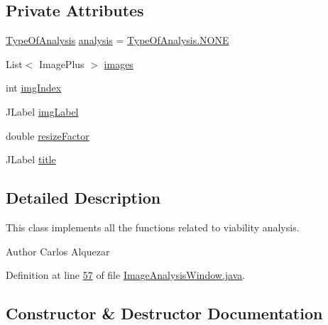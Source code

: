 \subsection*{Private Attributes}
\begin{DoxyCompactItemize}
\item 
\hyperlink{enumgui_1_1_image_analysis_window_1_1_type_of_analysis}{Type\+Of\+Analysis} \hyperlink{classgui_1_1_image_analysis_window_ae0c6f15cfb3c589fb7817738e51998bd}{analysis} = \hyperlink{enumgui_1_1_image_analysis_window_1_1_type_of_analysis_a899caa602e4fff675b17cdbab33607ec}{Type\+Of\+Analysis.\+N\+O\+NE}
\item 
List$<$ Image\+Plus $>$ \hyperlink{classgui_1_1_image_analysis_window_ab901d2d996b0bf250698c764d1c3949c}{images}
\item 
int \hyperlink{classgui_1_1_image_analysis_window_a43531d5121651cc0d006fedbedb03b00}{img\+Index}
\item 
J\+Label \hyperlink{classgui_1_1_image_analysis_window_a2a216fd8d92687a0d71b6064e26a3412}{img\+Label}
\item 
double \hyperlink{classgui_1_1_image_analysis_window_a1b91ec80db300f73bee276f3fe72e766}{resize\+Factor}
\item 
J\+Label \hyperlink{classgui_1_1_image_analysis_window_aceabe99400c9a27b60ab97a773981bbe}{title}
\end{DoxyCompactItemize}


\subsection{Detailed Description}
This class implements all the functions related to viability analysis.

\begin{DoxyAuthor}{Author}
Carlos Alquezar 
\end{DoxyAuthor}


Definition at line \hyperlink{_image_analysis_window_8java_source_l00057}{57} of file \hyperlink{_image_analysis_window_8java_source}{Image\+Analysis\+Window.\+java}.



\subsection{Constructor \& Destructor Documentation}
\hypertarget{classgui_1_1_image_analysis_window_a92a9acda5cd7fb137046e8ad2ba902a8}{}\label{classgui_1_1_image_analysis_window_a92a9acda5cd7fb137046e8ad2ba902a8} 

